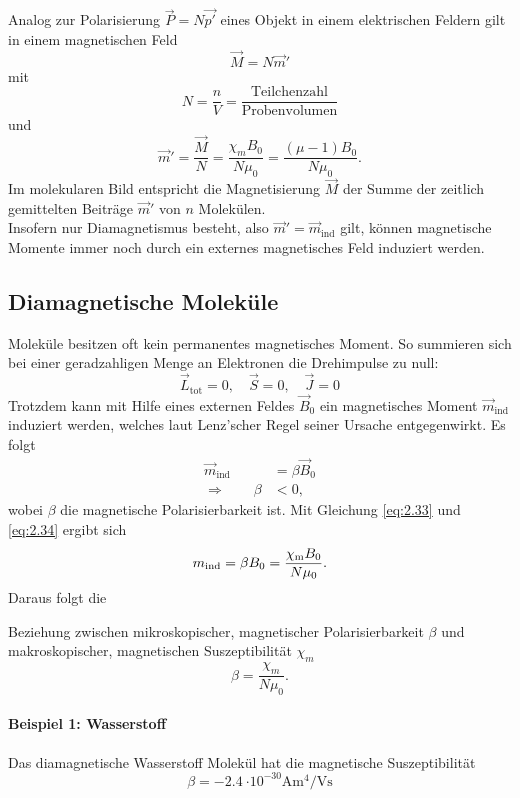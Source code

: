 	Analog zur Polarisierung $\vec{P} = N \vec{p'}$ eines Objekt in einem elektrischen Feldern gilt in einem magnetischen Feld
	\begin{equation}
		\label{2eq:.32}
		\vec{M} = N \vec{m}'
	\end{equation}
	mit
	$$
	N = \frac{n}{V} = \frac{\text{Teilchenzahl}}{\text{Probenvolumen}}
	$$ 
	und
	\begin{equation}
		\label{eq:2.33}
		\vec{m}' = \frac{\vec{M}}{N} = \frac{ \chi_{m} B_0}{N \mu_0} = \frac{\left( \mu -1 \right) B_0}{N \mu_0}.
	\end{equation}
	Im molekularen Bild entspricht die Magnetisierung $\vec{M}$ der Summe der zeitlich gemittelten Beiträge $\vec{m}'$ von $n$ Molekülen. \\[-1em]
	
	Insofern nur Diamagnetismus besteht, also $\vec{m}' = \vec m_{\text{ind}}$ gilt, können magnetische Momente immer noch durch ein externes magnetisches Feld induziert werden.

	\subsection{Diamagnetische Moleküle} 
	Moleküle besitzen oft kein permanentes magnetisches Moment. So summieren sich bei einer geradzahligen Menge an Elektronen die Drehimpulse zu null:
	$$
	\vec{L}_{\text{tot}} = 0, \quad \vec{S}= 0 , \quad \vec{J} = 0 
	$$
	Trotzdem kann mit Hilfe eines externen Feldes $\vec{B}_{0}$ ein magnetisches Moment $\vec{m}_{\text{ind}}$ induziert werden, welches laut Lenz'scher Regel seiner Ursache entgegenwirkt. Es folgt
	\begin{align}
		\label{eq:2.34}
		\vec{m}_{\text{ind}} &= \beta \vec{B}_{0}\\
		\Rightarrow  \qquad\beta &< 0,
	\end{align}
	wobei $\beta$ die magnetische Polarisierbarkeit ist. Mit Gleichung \eqref{eq:2.33} und \eqref{eq:2.34} ergibt sich
	$$m_\text{ind}=\beta B_0=\frac{\chi_\text m B_0}{N\mu_0}.
	$$
	Daraus folgt die
	\begin{important}
		Beziehung zwischen mikroskopischer, magnetischer Polarisierbarkeit $\beta$ und makroskopischer, magnetischen Suszeptibilität $\chi_m$
		$$
		\beta = \frac{\chi_{m}}{N \mu_0}.
		$$
	\end{important}
	\paragraph{Beispiel 1: Wasserstoff }  Das diamagnetische Wasserstoff Molekül  hat die magnetische Suszeptibilität
	$$
	\beta = -\SI{2,4}{\cdot 10^{-30} \ampere \meter^4 \per \volt \second}
	$$
